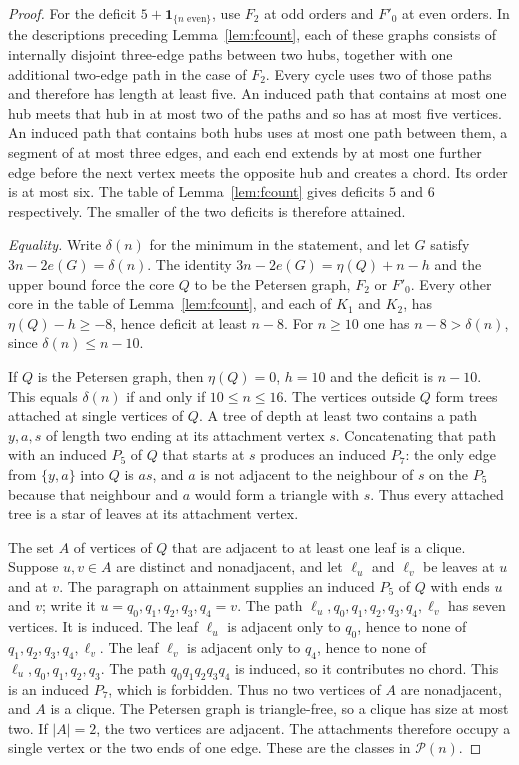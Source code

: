 \documentclass[ASNA]{USG}
\theoremstyle{WBstyletwo}
\numberwithin{equation}{section}
\begin{document}
\begin{proof}
For the deficit $5+\mathbf{1}_{\{n\text{ even}\}}$, use $F_2$ at odd orders and $F'_0$ at even orders. In the descriptions preceding Lemma~\ref{lem:fcount}, each of these graphs consists of internally disjoint three-edge paths between two hubs, together with one additional two-edge path in the case of $F_2$. Every cycle uses two of those paths and therefore has length at least five. An induced path that contains at most one hub meets that hub in at most two of the paths and so has at most five vertices. An induced path that contains both hubs uses at most one path between them, a segment of at most three edges, and each end extends by at most one further edge before the next vertex meets the opposite hub and creates a chord. Its order is at most six. The table of Lemma~\ref{lem:fcount} gives deficits $5$ and $6$ respectively. The smaller of the two deficits is therefore attained.

\emph{Equality.}
Write $\delta(n)$ for the minimum in the statement, and let $G$ satisfy $3n-2e(G)=\delta(n)$. The identity $3n-2e(G)=\eta(Q)+n-h$ and the upper bound force the core $Q$ to be the Petersen graph, $F_2$ or $F'_0$. Every other core in the table of Lemma~\ref{lem:fcount}, and each of $K_1$ and $K_2$, has $\eta(Q)-h\ge -8$, hence deficit at least $n-8$. For $n\ge 10$ one has $n-8>\delta(n)$, since $\delta(n)\le n-10$.

If $Q$ is the Petersen graph, then $\eta(Q)=0$, $h=10$ and the deficit is $n-10$. This equals $\delta(n)$ if and only if $10\le n\le 16$. The vertices outside $Q$ form trees attached at single vertices of $Q$. A tree of depth at least two contains a path $y,a,s$ of length two ending at its attachment vertex $s$. Concatenating that path with an induced $P_5$ of $Q$ that starts at $s$ produces an induced $P_7$: the only edge from $\{y,a\}$ into $Q$ is $as$, and $a$ is not adjacent to the neighbour of $s$ on the $P_5$ because that neighbour and $a$ would form a triangle with $s$. Thus every attached tree is a star of leaves at its attachment vertex.

The set $A$ of vertices of $Q$ that are adjacent to at least one leaf is a clique. Suppose $u,v\in A$ are distinct and nonadjacent, and let $\ell_u$ and $\ell_v$ be leaves at $u$ and at $v$. The paragraph on attainment supplies an induced $P_5$ of $Q$ with ends $u$ and $v$; write it $u=q_0,q_1,q_2,q_3,q_4=v$. The path $\ell_u,q_0,q_1,q_2,q_3,q_4,\ell_v$ has seven vertices. It is induced. The leaf $\ell_u$ is adjacent only to $q_0$, hence to none of $q_1,q_2,q_3,q_4,\ell_v$. The leaf $\ell_v$ is adjacent only to $q_4$, hence to none of $\ell_u,q_0,q_1,q_2,q_3$. The path $q_0q_1q_2q_3q_4$ is induced, so it contributes no chord. This is an induced $P_7$, which is forbidden. Thus no two vertices of $A$ are nonadjacent, and $A$ is a clique. The Petersen graph is triangle-free, so a clique has size at most two. If $|A|=2$, the two vertices are adjacent. The attachments therefore occupy a single vertex or the two ends of one edge. These are the classes in $\mathcal P(n)$.


\end{proof}
\end{document}
